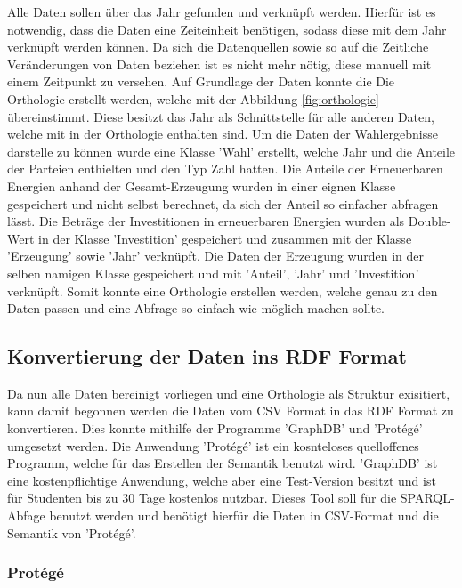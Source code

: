\documentclass[12pt]{article}
\begin{document}
Alle Daten sollen über das Jahr gefunden und verknüpft werden. Hierfür ist es notwendig, dass die Daten eine Zeiteinheit benötigen, sodass diese mit dem Jahr verknüpft werden können. Da sich die Datenquellen sowie so auf die Zeitliche Veränderungen von Daten beziehen ist es nicht mehr nötig, diese manuell mit einem Zeitpunkt zu versehen. Auf Grundlage der Daten konnte die Die Orthologie erstellt werden, welche mit der Abbildung \ref{fig:orthologie} übereinstimmt. Diese besitzt das Jahr als Schnittstelle für alle anderen Daten, welche mit in der Orthologie enthalten sind. Um die Daten der Wahlergebnisse darstelle zu können wurde eine Klasse 'Wahl' erstellt, welche Jahr und die Anteile der Parteien enthielten und den Typ Zahl hatten. Die Anteile der Erneuerbaren Energien anhand der Gesamt-Erzeugung wurden in einer eignen Klasse gespeichert und nicht selbst berechnet, da sich der Anteil so einfacher abfragen lässt. Die Beträge der Investitionen in erneuerbaren Energien wurden als Double-Wert in der Klasse 'Investition' gespeichert und zusammen mit der Klasse 'Erzeugung' sowie 'Jahr' verknüpft. Die Daten der Erzeugung wurden in der selben namigen Klasse gespeichert und mit 'Anteil', 'Jahr' und 'Investition' verknüpft. Somit konnte eine Orthologie erstellen werden, welche genau zu den Daten passen und eine Abfrage so einfach wie möglich machen sollte.
    

        \subsection{Konvertierung der Daten ins RDF Format}
        
Da nun alle Daten bereinigt vorliegen und eine Orthologie als Struktur exisitiert, kann damit begonnen werden die Daten vom CSV Format in das RDF Format zu konvertieren. Dies konnte mithilfe der Programme 'GraphDB' und 'Protégé' umgesetzt werden. Die Anwendung 'Protégé' ist ein kosnteloses quelloffenes Programm, welche für das Erstellen der Semantik benutzt wird. 'GraphDB' ist eine kostenpflichtige Anwendung, welche aber eine Test-Version besitzt und ist für Studenten bis zu 30 Tage kostenlos nutzbar. Dieses Tool soll für die SPARQL-Abfage benutzt werden und benötigt hierfür die Daten in CSV-Format und die Semantik von 'Protégé'.

            \subsubsection{Protégé}
\end{document}
